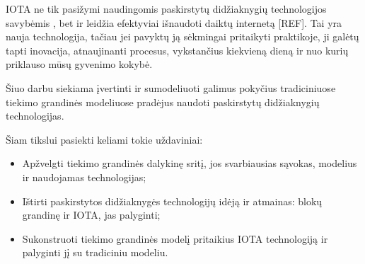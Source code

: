 IOTA ne tik pasižymi naudingomis paskirstytų didžiaknygių technologijos savybėmis \cite{bramas2018stability}, bet ir leidžia efektyviai išnaudoti daiktų internetą [REF]. Tai yra nauja technologija, tačiau jei pavyktų ją sėkmingai pritaikyti praktikoje, ji galėtų tapti inovacija, atnaujinanti procesus, vykstančius kiekvieną dieną ir nuo kurių priklauso mūsų gyvenimo kokybė.

Šiuo darbu siekiama įvertinti ir sumodeliuoti galimus pokyčius tradiciniuose tiekimo grandinės modeliuose pradėjus naudoti paskirstytų didžiaknygių technologijas.

Šiam tikslui pasiekti keliami tokie uždaviniai:
\begin{itemize}
    \item Apžvelgti tiekimo grandinės dalykinę sritį, jos svarbiausias sąvokas, modelius ir naudojamas technologijas;
    \item Ištirti paskirstytos didžiaknygės technologijų idėją ir atmainas: blokų grandinę ir IOTA, jas palyginti;
    \item Sukonstruoti tiekimo grandinės modelį pritaikius IOTA technologiją ir palyginti jį su tradiciniu modeliu.
\end{itemize}

